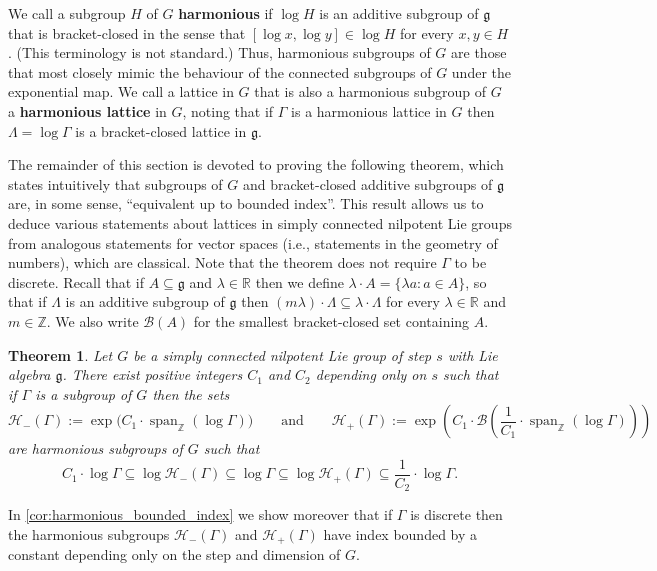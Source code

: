 \documentclass[11pt]{article}
\numberwithin{equation}{section}
\theoremstyle{plain}
\newtheorem{thm}{Theorem}[section]
\theoremstyle{definition}
\theoremstyle{remark}
\numberwithin{equation}{section}
\newcommand{\R}{\mathbb R}
\newcommand{\Z}{\mathbb Z}
\numberwithin{equation}{section}
\newcommand{\spanZ}{\operatorname{span}_\Z}
\begin{document}
%

We call a subgroup $H$ of $G$ \textbf{harmonious} if $\log H$ is an additive subgroup of $\mathfrak{g}$ that is bracket-closed in the sense that $[\log x, \log y]\in \log H$ for every $x,y\in H$. (This terminology is not standard.) Thus, harmonious subgroups of $G$ are those that most closely mimic the behaviour of the connected subgroups of $G$ under the exponential map. We call a lattice in $G$ that is also a harmonious subgroup of $G$ a \textbf{harmonious lattice} in $G$, noting that if $\Gamma$ is a harmonious lattice in $G$ then $\Lambda=\log \Gamma$ is a bracket-closed lattice in $\mathfrak{g}$.

\medskip



The remainder of this section is devoted to proving the following theorem, which states intuitively that subgroups of $G$ and bracket-closed additive subgroups of $\mathfrak{g}$ are, in some sense, ``equivalent up to bounded index''.  This result allows us to deduce various statements about lattices in simply connected nilpotent Lie groups from analogous statements for vector spaces (i.e., statements in the geometry of numbers), which are classical. Note that the theorem does not require $\Gamma$ to be discrete.
Recall that if $A \subseteq \mathfrak{g}$ and $\lambda \in \R$ then we define $\lambda \cdot A = \{\lambda a:a\in A\}$, so that if $\Lambda$ is an additive subgroup of $\mathfrak{g}$ then $(m\lambda) \cdot \Lambda \subseteq \lambda \cdot \Lambda$ for every $\lambda\in \R$ and $m\in \Z$. We also write $\mathscr{B}(A)$ for the smallest bracket-closed set containing $A$.

\begin{thm}
\label{thm:harmonious}
Let $G$ be a simply connected nilpotent Lie group of step $s$ with Lie algebra $\mathfrak{g}$. There exist  positive integers $C_1$ and $C_2$ depending only on $s$ such that if $\Gamma$ is a subgroup of $G$ then the sets
\[\mathscr{H}_-(\Gamma):= \exp\Bigr(C_1\cdot \spanZ(\log \Gamma)\Bigr)
%
%
%
\qquad\text{and}\qquad
\mathscr{H}_+(\Gamma):=\exp\left(C_1 \cdot \mathscr{B}\left(\frac{1}{C_1} \cdot \spanZ (\log \Gamma)\right)\right) \]
are harmonious subgroups of $G$ such that 
\[C_1 \cdot \log \Gamma \subseteq \log \mathscr{H}_-(\Gamma) \subseteq \log \Gamma \subseteq \log \mathscr{H}_+(\Gamma) \subseteq \frac{1}{C_2} \cdot \log \Gamma.\]
\end{thm}

In \cref{cor:harmonious_bounded_index} we show moreover that if $\Gamma$ is discrete then the harmonious subgroups $\mathscr{H}_-(\Gamma)$ and $\mathscr{H}_+(\Gamma)$ have index 
%
 bounded by a constant depending only on the step and dimension of $G$.
%
\end{document}

